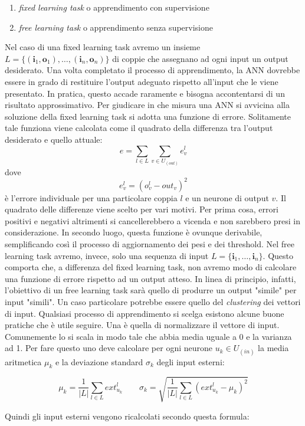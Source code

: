\documentclass[10pt,a4paper]{article}
\newcommand{\ii}{\mathbf{i}}
\newcommand{\oo}{\mathbf{o}}
\begin{document}
\begin{enumerate}
\item{\emph{fixed learning task} o apprendimento con supervisione}
\item{\emph{free learning task} o apprendimento senza supervisione}
\end{enumerate}

Nel caso di una fixed learning task avremo un insieme 
$L=\{(\ii_1,\oo_1),\dots,(\ii_n,\oo_n)\}$ di coppie che assegnano ad ogni input un output desiderato. Una volta completato il processo di apprendimento, la ANN dovrebbe essere in grado di restituire l'output adeguato rispetto all'input che le viene presentato. In pratica, questo accade raramente e bisogna accontentarsi di un risultato approssimativo.
Per giudicare in che misura una ANN si avvicina alla soluzione della fixed learning task si adotta una funzione di errore. Solitamente tale funziona viene calcolata come il quadrato della differenza tra l'output desiderato e quello attuale:
$$
e = \sum_{l \in L} \sum_{v \in U_{(out)}} e^l_v
$$
dove
$$
e^l_v = (o^l_v - out_v)^2
$$
è l'errore individuale per una particolare coppia $l$ e un neurone di output $v$. Il quadrato delle differenze viene scelto per vari motivi. Per prima cosa, errori positivi e negativi altrimenti si cancellerebbero a vicenda e non sarebbero presi in considerazione. In secondo luogo, questa funzione è ovunque derivabile, semplificando così il processo di aggiornamento dei pesi e dei threshold.
Nel free learning task avremo, invece, solo una sequenza di input $L = \{\ii_1, \dots, \ii_n\}$. Questo comporta che, a differenza del fixed learning task, non avremo modo di calcolare una funzione di errore rispetto ad un output atteso. In linea di principio, infatti, l'obiettivo di un free learning task sarà quello di produrre un output "simile" per input "simili". Un caso particolare potrebbe essere quello del \emph{clustering} dei vettori di input. 
Qualsiasi processo di apprendimento si scelga esistono alcune buone pratiche che è utile seguire. Una è quella di normalizzare il vettore di input. Comunemente lo si scala in modo tale che abbia media uguale a 0 e la varianza ad 1. Per fare questo uno deve calcolare per ogni neurone $u_k \in U_{(in)}$ la media aritmetica $\mu_k$ e la deviazione standard $\sigma_k$ degli input esterni:

$$
\mu_k = \frac{1}{|L|}\sum_{l \in L} ext^l_{u_k} \quad \quad \sigma_k = \sqrt{\frac{1}{|L|}\sum_{l \in L} (ext^l_{u_k} - \mu_k)^2}
$$

Quindi gli input esterni vengono ricalcolati secondo questa formula:
\end{document}
